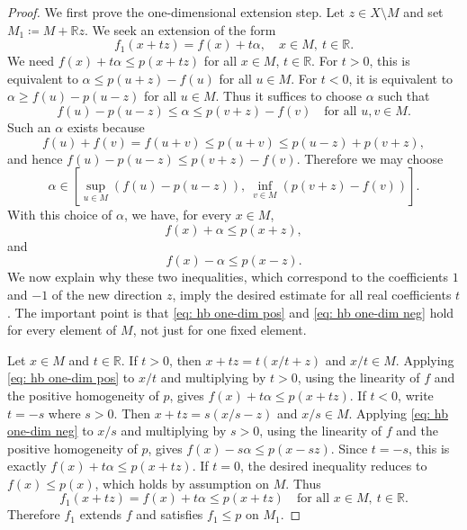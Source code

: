 \begin{proof}
    We first prove the one-dimensional extension step. Let \(z \in X \setminus M\) and set \(M_1 \coloneqq M + \mathbb{R} z\). We seek an extension of the form
    \[
        f_1(x + tz) = f(x) + t\alpha, \quad x \in M,\ t \in \mathbb{R}.
    \]
    We need \(f(x) + t\alpha \leq p(x + tz)\) for all \(x \in M\), \(t \in \mathbb{R}\). For \(t > 0\), this is equivalent to \(\alpha \leq p(u + z) - f(u)\) for all \(u \in M\). For \(t < 0\), it is equivalent to \(\alpha \geq f(u) - p(u - z)\) for all \(u \in M\). Thus it suffices to choose \(\alpha\) such that
    \[
        f(u) - p(u - z) \leq \alpha \leq p(v + z) - f(v) \quad \text{for all } u, v \in M.
    \]
    Such an \(\alpha\) exists because
    \[
        f(u) + f(v) = f(u + v) \leq p(u + v) \leq p(u - z) + p(v + z),
    \]
    and hence \(f(u) - p(u - z) \leq p(v + z) - f(v)\). Therefore we may choose
    \[
        \alpha \in \left[ \sup_{u \in M}\!\left( f(u) - p(u - z) \right),\ \inf_{v \in M}\!\left( p(v + z) - f(v) \right) \right].
    \]
    With this choice of \(\alpha\), we have, for every \(x \in M\),
    \begin{equation} \label{eq: hb one-dim pos}
        f(x) + \alpha \leq p(x + z),
    \end{equation}
    and
    \begin{equation} \label{eq: hb one-dim neg}
        f(x) - \alpha \leq p(x - z).
    \end{equation}
    We now explain why these two inequalities, which correspond to the coefficients \(1\) and \(-1\) of the new direction \(z\), imply the desired estimate for all real coefficients \(t\). The important point is that \autoref{eq: hb one-dim pos} and \autoref{eq: hb one-dim neg} hold for every element of \(M\), not just for one fixed element.

    Let \(x \in M\) and \(t \in \mathbb{R}\). If \(t > 0\), then \(x + tz = t(x/t + z)\) and \(x/t \in M\). Applying \autoref{eq: hb one-dim pos} to \(x/t\) and multiplying by \(t > 0\), using the linearity of \(f\) and the positive homogeneity of \(p\), gives \(f(x) + t\alpha \leq p(x + tz)\). If \(t < 0\), write \(t = -s\) where \(s > 0\). Then \(x + tz = s(x/s - z)\) and \(x/s \in M\). Applying \autoref{eq: hb one-dim neg} to \(x/s\) and multiplying by \(s > 0\), using the linearity of \(f\) and the positive homogeneity of \(p\), gives \(f(x) - s\alpha \leq p(x - sz)\). Since \(t = -s\), this is exactly \(f(x) + t\alpha \leq p(x + tz)\). If \(t = 0\), the desired inequality reduces to \(f(x) \leq p(x)\), which holds by assumption on \(M\). Thus
    \[
        f_1(x + tz) = f(x) + t\alpha \leq p(x + tz) \quad \text{for all } x \in M,\ t \in \mathbb{R}.
    \]
    Therefore \(f_1\) extends \(f\) and satisfies \(f_1 \leq p\) on \(M_1\).


\end{proof}
